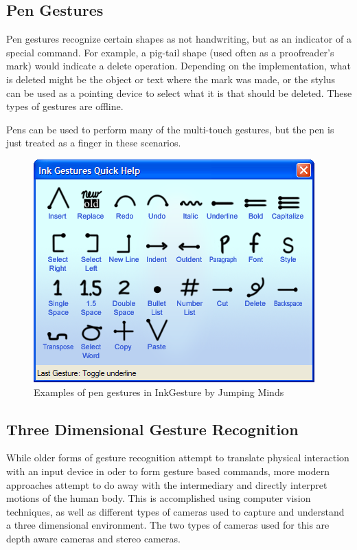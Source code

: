 \documentclass[11pt]{report}
\begin{document}
\subsection{Pen Gestures}

Pen gestures recognize certain shapes as not handwriting, but as an indicator of a special command.
For example, a pig-tail shape (used often as a proofreader's mark) would indicate a delete operation. 
Depending on the implementation, what is deleted might be the object or text where the mark was made, or the stylus can be used as a pointing device to select what it is that should be deleted.
These types of gestures are offline.

Pens can be used to perform many of the multi-touch gestures, but the pen is just treated as a finger in these scenarios.

\begin{figure}
\includegraphics[width=\textwidth]{pen-gestures}
\caption{Examples of pen gestures in InkGesture by Jumping Minds}
\end{figure}

\subsection{Three Dimensional Gesture Recognition}

While older forms of gesture recognition attempt to translate physical interaction with an input device in oder to form gesture based commands, more modern approaches attempt to do away with the intermediary and directly interpret motions of the human body.
This is accomplished using computer vision techniques, as well as different types of cameras used to capture and understand a three dimensional environment.
The two types of cameras used for this are depth aware cameras and stereo cameras.
\end{document}
